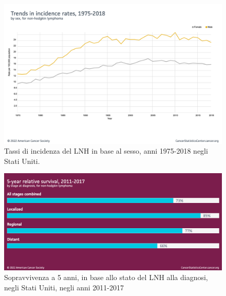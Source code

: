 \begin{figure}[H]
    \begin{center}
    \includegraphics[width=0.8\columnwidth]{img/Incidencerates1975-2018.png}
    \vspace{-3mm}
    \end{center}
    \caption{Tassi di incidenza del LNH in base al sesso, anni 1975-2018 negli Stati Uniti.
    \cite{Americanstatistic}}

\end{figure}

\begin{figure}[H]
    \begin{center}
    \includegraphics[width=0.8\columnwidth]{img/5-yearrelativesurvival2011-2017.png}
    \vspace{-3mm}
    \end{center}
    \caption{Sopravvivenza a 5 anni, in base allo stato del LNH alla diagnosi, negli Stati Uniti, negli anni 2011-2017
    \cite{Americanstatistic}}

\end{figure}

